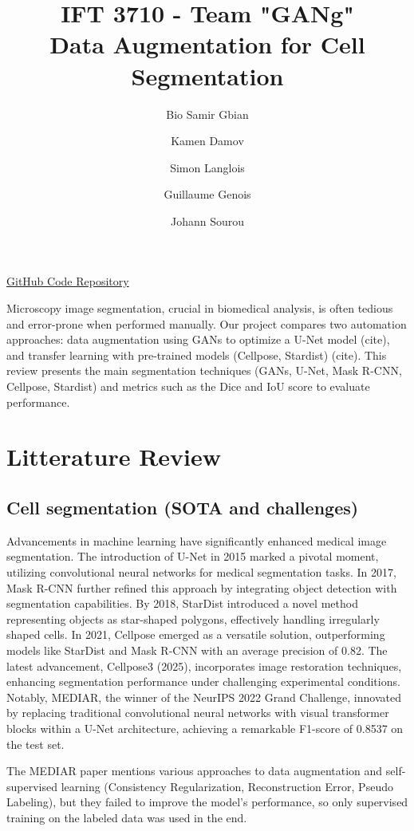 \documentclass[]{article}
\title{\textbf{IFT 3710 - Team "GANg"} \\ 
\textbf{Data Augmentation for Cell Segmentation}}
\author[1]{Bio Samir Gbian}
\author[1]{Kamen Damov}
\author[1]{Simon Langlois}
\author[1]{Guillaume Genois}
\author[1]{Johann Sourou}
\affil{Departement of Computer Science and Operations Research}
\affil[1]{University of Montreal}
\begin{document}
\maketitle

\href{https://github.com/KamenDamov/IFT3710-Advanced-Project-in-ML-AI}{GitHub Code Repository}

Microscopy image segmentation, crucial in biomedical analysis, is often tedious and error-prone when performed manually. Our project compares two automation approaches: data augmentation using GANs to optimize a U-Net model (cite), and transfer learning with pre-trained models (Cellpose, Stardist) (cite). This review presents the main segmentation techniques (GANs, U-Net, Mask R-CNN, Cellpose, Stardist) and metrics such as the Dice and IoU score to evaluate performance.

\section{Litterature Review}
\subsection{Cell segmentation (SOTA and challenges)}

Advancements in machine learning have significantly enhanced medical image segmentation. The introduction of U-Net in 2015 marked a pivotal moment, utilizing convolutional neural networks for medical segmentation tasks. In 2017, Mask R-CNN further refined this approach by integrating object detection with segmentation capabilities. By 2018, StarDist introduced a novel method representing objects as star-shaped polygons, effectively handling irregularly shaped cells. In 2021, Cellpose emerged as a versatile solution, outperforming models like StarDist and Mask R-CNN with an average precision of 0.82. The latest advancement, Cellpose3 (2025), incorporates image restoration techniques, enhancing segmentation performance under challenging experimental conditions. Notably, MEDIAR, the winner of the NeurIPS 2022 Grand Challenge, innovated by replacing traditional convolutional neural networks with visual transformer blocks within a U-Net architecture, achieving a remarkable F1-score of 0.8537 on the test set.

The MEDIAR paper \cite{pmlr-v212-lee23a} mentions various approaches to data augmentation and self-supervised learning (Consistency Regularization, Reconstruction Error, Pseudo Labeling), but they failed to improve the model's performance, so only supervised training on the labeled data was used in the end.
\end{document}
